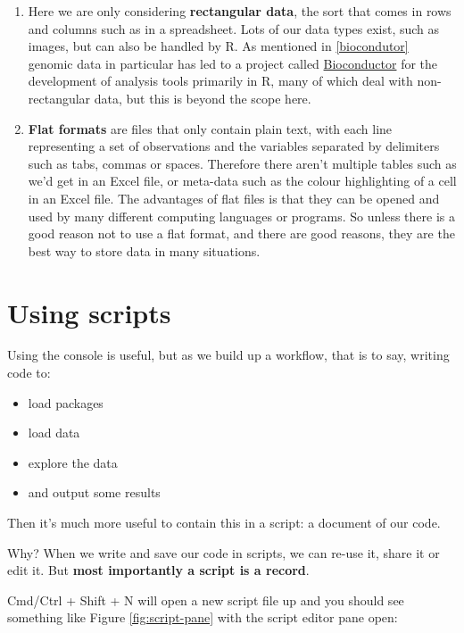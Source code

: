 \documentclass[12pt,]{book}
\providecommand{\tightlist}{%
  \setlength{\itemsep}{0pt}\setlength{\parskip}{0pt}}
\begin{document}
\begin{enumerate}
\def\labelenumi{\arabic{enumi}.}
\item
  Here we are only considering \textbf{rectangular data}, the sort that comes
  in rows and columns such as in a spreadsheet. Lots of our data types exist,
  such as images, but can also be
  handled by R. As mentioned in \ref{biocondutor} genomic data in particular has
  led to a project called \href{http://bioconductor.org/}{Bioconductor} for the
  development of analysis tools primarily in R, many of which deal with
  non-rectangular data, but this is beyond the scope here.
\item
  \textbf{Flat formats} are files that only contain plain text, with each line
  representing a set of observations and the variables separated by delimiters
  such as tabs, commas or spaces. Therefore there aren't multiple tables such
  as we'd get in an Excel file, or meta-data such as the colour highlighting of
  a cell in an Excel file. The advantages of flat files is that they can be
  opened and used by many different computing languages or programs.
  So unless there is a good reason not to use a flat format, and there are good
  reasons, they are the best way to store data in many situations.
\end{enumerate}

\hypertarget{using-scripts}{%
\section{Using scripts}\label{using-scripts}}

Using the console is useful, but as we build up a workflow, that is to say,
writing code to:

\begin{itemize}
\tightlist
\item
  load packages
\item
  load data
\item
  explore the data
\item
  and output some results
\end{itemize}

Then it's much more useful to contain this in a script: a document of our code.

Why? When we write and save our code in scripts, we can re-use it, share it or
edit it. But \textbf{most importantly a script is a record}.

Cmd/Ctrl + Shift + N will open a new script file up and you should see something
like Figure \ref{fig:script-pane} with the script editor pane open:
\end{document}
